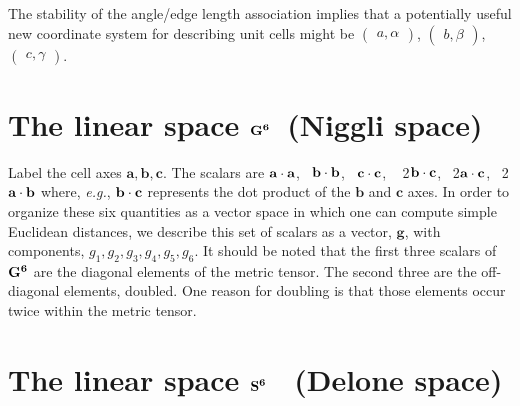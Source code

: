 \documentclass[preprint]{iucr}              %
\numberwithin{equation}{section}
\newcommand{\SVI}[0]{$\bf{S^{6}}$}
\newcommand{\GVI}[0]{$\bf{G^{6}}$}
\newcommand{\vdotv}[2]{${{\bf #1 \cdot #2}}$}
\begin{document}
The stability of the angle/edge length association implies
that a potentially  useful new coordinate system for describing unit cells 
might be $\begin{pmatrix} a,\alpha \end{pmatrix}$, 
 $\begin{pmatrix} b,\beta \end{pmatrix}$,  
 $\begin{pmatrix} c,\gamma \end{pmatrix}$.

\section{The linear space \GVI ~(Niggli space)}
\label{G6}

			Label  the cell axes ${\textbf{a}, \textbf{b}, \textbf{c}}$. The scalars are	\vdotv{\textbf{a}}{\textbf{a}},~ \vdotv{\textbf{b}}{\textbf{b}},~ \vdotv{\textbf{c}}{\textbf{c}},
			~ 2\vdotv{\textbf{b}}{\textbf{c}},~ 2\vdotv{\textbf{a}}{\textbf{c}},~ 2\vdotv{\textbf{a}}{\textbf{b}} where,
			{\it e.g.},
			\vdotv{\textbf{b}}{\textbf{c}} represents the dot product of the ${\textbf{b}}$  and ${\textbf{c}}$  axes. In order to organize these six quantities as a vector space in which one
			can compute simple Euclidean distances, we describe this set of scalars 
			as a vector, ${\textbf{g}}$, with components, $ {g}_1, {g}_2, {g}_3, {g}_4, {g}_5, {g}_6 $. \cite{Andrews2014}
		It should be noted that the first three scalars of \GVI{} are the
		 diagonal elements of the metric tensor. The second three are the 
		 off-diagonal elements, doubled. One reason for doubling is that those
		 elements occur twice within the metric tensor.

\section{The linear space \SVI{}~ (Delone space)}
\label{S6}
\end{document}
